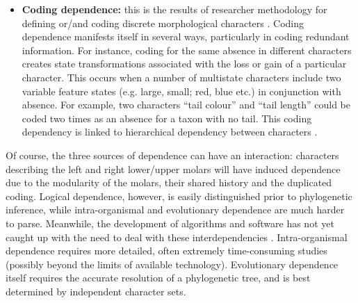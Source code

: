 \documentclass[12pt,letterpaper]{article}
\begin{document}
\begin{itemize}
    \item \textbf{Coding dependence:} this is the results of researcher methodology for defining or/and coding discrete morphological characters \citep{Brazeau2011,simoes2017giant}.
    Coding dependence manifests itself in several ways, particularly in coding redundant information.
    For instance, coding for the same absence in different characters creates state transformations associated with the loss or gain of a particular character.
    This occurs when a number of multistate characters include two variable feature states (e.g. large, small; red, blue etc.) in conjunction with absence.
    For example, two characters ``tail colour'' and ``tail length'' could be coded two times as an absence for a taxon with no tail.
    This coding dependency is linked to hierarchical dependency between characters \citep{wilkinson1995coping,BrazeauNA}. %
\end{itemize}

\noindent Of course, the three sources of dependence can have an interaction: characters describing the left and right lower/upper molars will have induced dependence due to the modularity of the molars, their shared history and the duplicated coding.
Logical dependence, however, is easily distinguished prior to phylogenetic inference, while intra-organismal and evolutionary dependence are much harder to parse. %
Meanwhile, the development of algorithms and software has not yet caught up with the need to deal with these interdependencies \citep{de2015parsimony,BrazeauNA}.
Intra-organismal dependence requires more detailed, often extremely time-consuming studies (possibly beyond the limits of available technology).
Evolutionary dependence itself requires the accurate resolution of a phylogenetic tree, and is best determined by independent character sets. 
\end{document}
